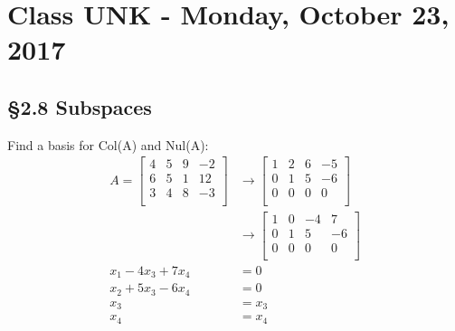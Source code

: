 \chapter{Class UNK - Monday, October 23, 2017}
\section{\S 2.8 Subspaces}

\begin{ex}
Find a basis for Col(A) and Nul(A):
\begin{align*}
A=\begin{bmatrix}
   4 & 5 & 9 & -2\\
   6 & 5 & 1 & 12\\
   3 & 4 & 8 & -3\\
\end{bmatrix} &\rightarrow \begin{bmatrix}
   1 & 2 & 6 & -5\\
   0 & 1 & 5 & -6\\
   0 & 0 & 0 & 0\\
\end{bmatrix}\\
&\rightarrow \begin{bmatrix}
   1 & 0 & -4 & 7\\
   0 & 1 & 5 & -6\\
   0 & 0 & 0 & 0\\
\end{bmatrix}\\
x_1-4x_3+7x_4&=0\\
x_2+5x_3-6x_4&=0\\
x_3&=x_3\\
x_4&=x_4\\
\end{align*}
\end{ex}
\begin{ex}

\end{ex}